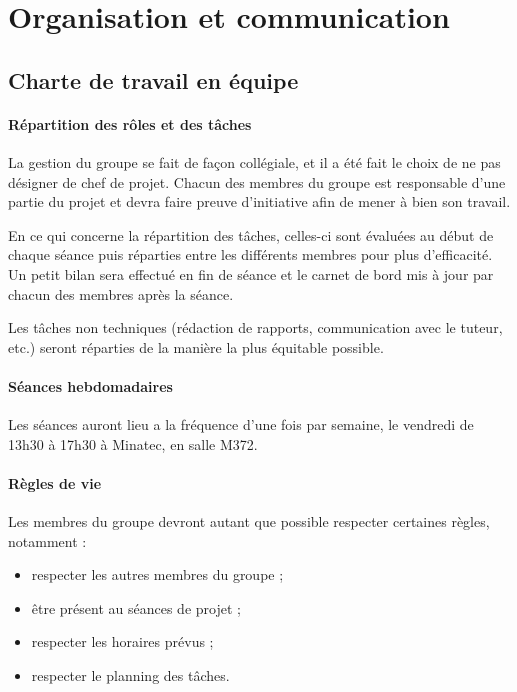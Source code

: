 \documentclass[a4paper,12pt]{report}
\begin{document}
\chapter{Organisation et communication}


	\section{Charte de travail en équipe}
	
		\subsubsection{Répartition des rôles et des tâches}
		La gestion du groupe se fait de façon collégiale, et il a été fait le choix de ne pas désigner de chef de projet. Chacun des membres du groupe est responsable d'une partie du projet et devra faire preuve d'initiative afin de mener à bien son travail.
		
En ce qui concerne la répartition des tâches, celles-ci sont évaluées au début de chaque séance puis réparties entre les différents membres pour plus d'efficacité. Un petit bilan sera effectué en fin de séance et le carnet de bord mis à jour par chacun des membres après la séance.

Les tâches non techniques (rédaction de rapports, communication avec le tuteur, etc.) seront réparties de la manière la plus équitable possible.


		\subsubsection{Séances hebdomadaires}
		Les séances auront lieu a la fréquence d'une fois par semaine, le vendredi de 13h30 à 17h30 à Minatec, en salle M372.
		
		
		\subsubsection{Règles de vie}
		Les membres du groupe devront autant que possible respecter certaines règles, notamment :
		
		\begin{itemize}
			\item respecter les autres membres du groupe ;
			\item être présent au séances de projet ;
			\item respecter les horaires prévus ;
			\item respecter le planning des tâches.
		\end{itemize}
		
\end{document}
